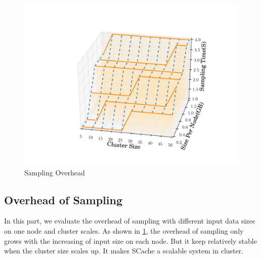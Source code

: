 \begin{figure}
	\centering
	\includegraphics[width=0.9\linewidth]{fig/sampling}
	\caption{Sampling Overhead}
	\label{fig:sampling}
\end{figure}
\subsection{Overhead of Sampling}
In this part, we evaluate the overhead of sampling with different input data sizes on one node and cluster scales. As shown in \ref{fig:sampling}, the overhead of sampling only grows with the increasing of input size on each node. But it keep relatively stable when the cluster size scales up. It makes SCache a scalable system in cluster.

